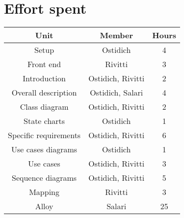 \chapter{Effort spent}

\begin{table}[h]
    \centering
    \begin{tabular}{|c|c|c|}
        \hline \textbf{Unit} & \textbf{Member} & \textbf{Hours} \\
        \hline Setup & Ostidich & 4 \\
        \hline Front end & Rivitti & 3 \\
        \hline Introduction & Ostidich, Rivitti & 2 \\
        \hline Overall description & Ostidich, Salari & 4 \\
        \hline Class diagram & Ostidich, Rivitti & 2 \\
        \hline State charts & Ostidich & 1 \\
        \hline Specific requirements & Ostidich, Rivitti & 6 \\
        \hline Use cases diagrams & Ostidich & 1 \\
        \hline Use cases & Ostidich, Rivitti & 3 \\
        \hline Sequence diagrams & Ostidich, Rivitti & 5 \\
        \hline Mapping & Rivitti & 3 \\
        \hline Alloy & Salari & 25 \\
        \hline
    \end{tabular}
\end{table}

